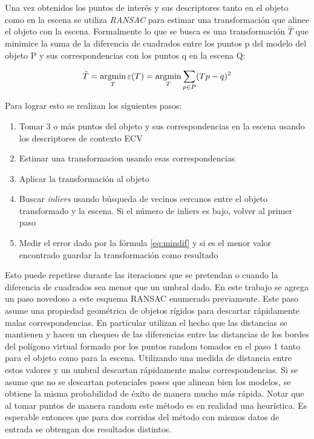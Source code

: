 Una vez obtenidos los puntos de interés y sus descriptores tanto en el objeto como en la escena se utiliza \textit{RANSAC} \cite{ransac} para estimar una transformación que alinee el objeto con la escena. Formalmente lo que se busca es una transformación $\hat{T}$ que minimice la suma de la diferencia de cuadrados entre los puntos p del modelo del objeto P y sus correspondencias con los puntos q en la escena Q:

\begin{equation}\label{eq:mindif}
\hat{T} = \operatorname*{argmin}_T \varepsilon(T) = \operatorname*{argmin}_T \sum_{p \in P}(Tp - q)^2
\end{equation}

Para lograr esto se realizan los siguientes pasos:
\begin{enumerate}
	\item Tomar 3 o más puntos del objeto y sus correspondencias en la escena usando los descriptores de contexto ECV
	\item Estimar una transformacion usando esas correspondencias
	\item Aplicar la transformación al objeto
	\item Buscar \textit{inliers} usando búsqueda de vecinos cercanos entre el objeto transformado y la escena. Si el número de inliers es bajo, volver al primer paso
	\item Medir el error dado por la fórmula \eqref{eq:mindif} y si es el menor valor encontrado guardar la transformación como resultado
\end{enumerate}

Esto puede repetirse durante las iteraciones que se pretendan o cuando la diferencia de cuadrados sea menor que un umbral dado. En este trabajo se agrega un paso novedoso a este esquema RANSAC enumerado previamente. Este paso asume una propiedad geométrica de objetos rígidos para descartar rápidamente malas correspondencias. En particular utilizan el hecho que las distancias se mantienen y hacen un chequeo de las diferencias entre las distancias de los bordes del polígono virtual formado por los puntos random tomados en el paso 1 tanto para el objeto como para la escena. Utilizando una medida de distancia entre estos valores y un umbral descartan rápidamente malas correspondencias. Si se asume que no se descartan potenciales poses que alinean bien los modelos, se obtiene la misma probabilidad de éxito de manera mucho más rápida. Notar que al tomar puntos de manera random este método es en realidad una heurística. Es esperable entonces que para dos corridas del método con mismos datos de entrada se obtengan dos resultados distintos.


